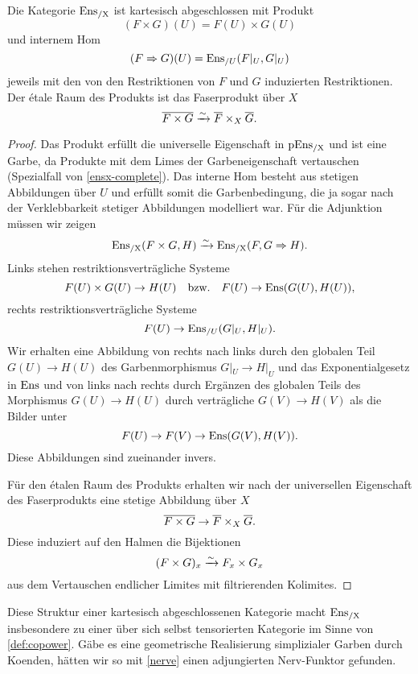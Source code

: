 \begin{prop} \label{ensx-cart-closed}
  Die Kategorie $\operatorname{Ens_{/X}}$ ist kartesisch abgeschlossen mit Produkt
  \[ (F \times G)(U) = F(U) \times G(U) \]
  und internem Hom
  \[ (F \Rightarrow G)(U) = \operatorname{Ens}_{/U}(F|_U, G|_U) \]
  jeweils mit den von den Restriktionen von $F$ und $G$ induzierten
  Restriktionen. Der étale Raum des Produkts ist das Faserprodukt über
  $X$
  \[ \overline{F \times G}
     \xrightarrow[]{\sim} \overline{F} \times_X \overline{G}. \]
\end{prop}
\begin{proof}
  Das Produkt erfüllt die universelle Eigenschaft in $\operatorname{pEns_{/X}}$ und ist
  eine Garbe, da Produkte mit dem Limes der Garbeneigenschaft
  vertauschen (Spezialfall von \ref{ensx-complete}). Das interne Hom
  besteht aus stetigen Abbildungen über $U$ und erfüllt somit die
  Garbenbedingung, die ja sogar nach der Verklebbarkeit stetiger
  Abbildungen modelliert war. Für die Adjunktion müssen wir zeigen
  \[ \operatorname{Ens_{/X}}(F \times G, H) \xrightarrow[]{\sim} \operatorname{Ens_{/X}}(F, G \Rightarrow H). \]
  Links stehen restriktionsverträgliche Systeme
  \[ F(U) \times G(U) \to H(U) \quad \text{bzw.} \quad
  F(U) \to \operatorname{Ens}(G(U), H(U)),
  \]
  rechts restriktionsverträgliche Systeme
  \[ F(U) \to \operatorname{Ens}_{/U}(G|_U, H|_U) . \]
  Wir erhalten eine Abbildung von rechts nach links durch den globalen
  Teil $G(U) \to H(U)$ des Garbenmorphismus $G|_U \to H|_U$ und das
  Exponentialgesetz in $\operatorname{Ens}$ und von links nach rechts durch Ergänzen
  des globalen Teils des Morphismus $G(U) \to H(U)$ durch verträgliche
  $G(V) \to H(V)$ als die Bilder unter
  \[ F(U) \to F(V) \to \operatorname{Ens}(G(V), H(V)). \]
  Diese Abbildungen sind zueinander invers.

  Für den étalen Raum des Produkts erhalten wir nach der universellen
  Eigenschaft des Faserprodukts eine stetige Abbildung über $X$
  \[ \overline{F \times G}
  \to \overline{F} \times_X \overline{G}.
  \]
  Diese induziert auf den Halmen die Bijektionen
  \[ (F \times G)_x \xrightarrow[]{\sim} F_x \times G_x \]
  aus dem Vertauschen endlicher Limites mit filtrierenden Kolimites.
\end{proof}
Diese Struktur einer kartesisch abgeschlossenen Kategorie macht
$\operatorname{Ens_{/X}}$ insbesondere zu einer über sich selbst tensorierten Kategorie
im Sinne von \ref{def:copower}. Gäbe es eine geometrische Realisierung
simplizialer Garben durch Koenden, hätten wir so mit \ref{nerve} einen
adjungierten Nerv-Funktor gefunden.

